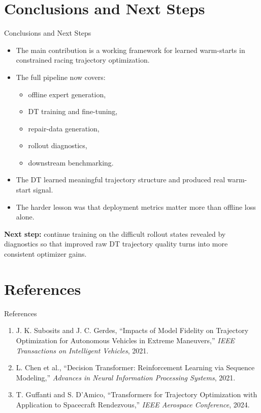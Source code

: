 \documentclass[aspectratio=169]{beamer}
\begin{document}
\section{Conclusions and Next Steps}
\begin{frame}{Conclusions and Next Steps}
\begin{itemize}
  \item The main contribution is a working framework for learned warm-starts in constrained racing trajectory optimization.
  \item The full pipeline now covers:
  \begin{itemize}
    \item offline expert generation,
    \item DT training and fine-tuning,
    \item repair-data generation,
    \item rollout diagnostics,
    \item downstream benchmarking.
  \end{itemize}
  \item The DT learned meaningful trajectory structure and produced real warm-start signal.
  \item The harder lesson was that deployment metrics matter more than offline loss alone.
\end{itemize}

\vspace{0.5em}
\textbf{Next step:} continue training on the difficult rollout states revealed by diagnostics so that improved raw DT trajectory quality turns into more consistent optimizer gains.
\end{frame}

\section{References}
\begin{frame}{References}
\footnotesize
\begin{enumerate}
  \item J. K. Subosits and J. C. Gerdes, ``Impacts of Model Fidelity on Trajectory Optimization for Autonomous Vehicles in Extreme Maneuvers,'' \textit{IEEE Transactions on Intelligent Vehicles}, 2021.
  \item L. Chen et al., ``Decision Transformer: Reinforcement Learning via Sequence Modeling,'' \textit{Advances in Neural Information Processing Systems}, 2021.
  \item T. Guffanti and S. D'Amico, ``Transformers for Trajectory Optimization with Application to Spacecraft Rendezvous,'' \textit{IEEE Aerospace Conference}, 2024.
\end{enumerate}
\end{frame}
\end{document}
